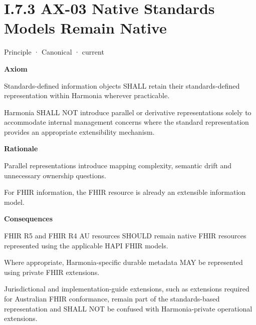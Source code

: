 \section*{I.7.3 AX-03 Native Standards Models Remain Native}
\label{navigation:I.7.3}

\label{element:e99a4e2bf99f476d876394300d6b9c3d}
{\small Principle · Canonical · current}\par

\par\medskip\textbf{Axiom}\par


Standards-defined information objects SHALL retain their
standards-defined representation within Harmonia wherever practicable.



Harmonia SHALL NOT introduce parallel or derivative representations
solely to accommodate internal management concerns where the standard
representation provides an appropriate extensibility mechanism.



\par\medskip\textbf{Rationale}\par


Parallel representations introduce mapping complexity, semantic drift
and unnecessary ownership questions.



For FHIR information, the FHIR resource is already an extensible
information model.



\par\medskip\textbf{Consequences}\par


FHIR R5 and FHIR R4 AU resources SHOULD remain native FHIR resources
represented using the applicable HAPI FHIR models.



Where appropriate, Harmonia-specific durable metadata MAY be represented
using private FHIR extensions.



Jurisdictional and implementation-guide extensions, such as extensions
required for Australian FHIR conformance, remain part of the
standards-based representation and SHALL NOT be confused with
Harmonia-private operational extensions.



